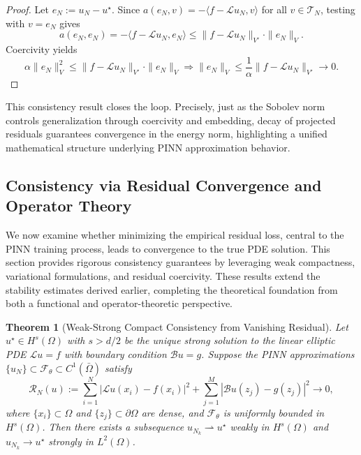 \documentclass[11pt, a4paper]{article}
\newtheorem{thm}{Theorem}
\begin{document}
\begin{proof}
Let $e_N := u_N - u^\star$. Since $a(e_N, v) = -\langle f - \mathcal{L} u_N, v \rangle$ for all $v \in \mathcal{T}_N$, testing with $v = e_N$ gives
\[
a(e_N, e_N) = -\langle f - \mathcal{L} u_N, e_N \rangle \leq \| f - \mathcal{L} u_N \|_{V'} \cdot \| e_N \|_V.
\]
Coercivity yields
\[
\alpha \| e_N \|_V^2 \leq \| f - \mathcal{L} u_N \|_{V'} \cdot \| e_N \|_V \Rightarrow \| e_N \|_V \leq \frac{1}{\alpha} \| f - \mathcal{L} u_N \|_{V'} \to 0.
\]
\end{proof}This consistency result closes the loop. Precisely, just as the Sobolev norm controls generalization through coercivity and embedding, decay of projected residuals guarantees convergence in the energy norm, highlighting a unified mathematical structure underlying PINN approximation behavior.

\subsection{Consistency via Residual Convergence and Operator Theory}

We now examine whether minimizing the empirical residual loss, central to the PINN training process, leads to convergence to the true PDE solution. This section provides rigorous consistency guarantees by leveraging weak compactness, variational formulations, and residual coercivity. These results extend the stability estimates derived earlier, completing the theoretical foundation from both a functional and operator-theoretic perspective.

\begin{thm}[Weak-Strong Compact Consistency from Vanishing Residual]
\label{thm:compact_weak}
Let $u^\star \in H^s(\Omega)$ with $s > d/2$ be the unique strong solution to the linear elliptic PDE $\mathcal{L}u = f$ with boundary condition $\mathcal{B}u = g$. Suppose the PINN approximations $\{u_N\} \subset \mathcal{F}_\theta \subset C^1(\bar{\Omega})$ satisfy
\[
\mathcal{R}_N(u) := \sum_{i=1}^N |\mathcal{L}u(x_i) - f(x_i)|^2 + \sum_{j=1}^M |\mathcal{B}u(z_j) - g(z_j)|^2 \to 0,
\]
where $\{x_i\} \subset \Omega$ and $\{z_j\} \subset \partial\Omega$ are dense, and $\mathcal{F}_\theta$ is uniformly bounded in $H^s(\Omega)$. Then there exists a subsequence $u_{N_k} \rightharpoonup u^\star$ weakly in $H^s(\Omega)$ and $u_{N_k} \to u^\star$ strongly in $L^2(\Omega)$.
\end{thm}
\end{document}
